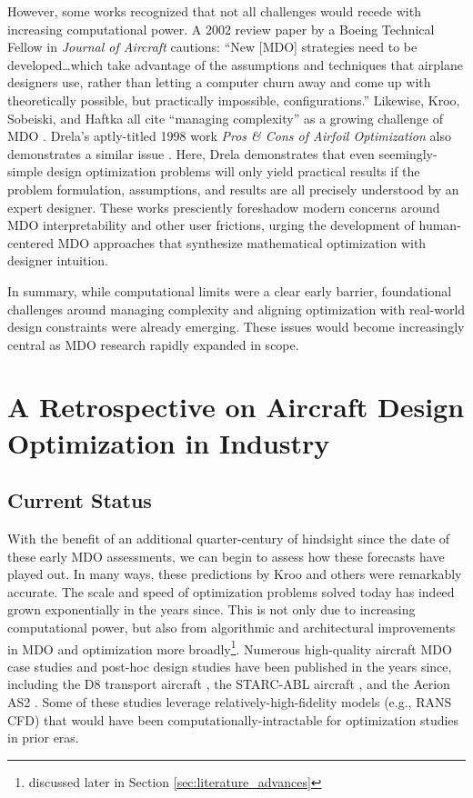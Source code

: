 \documentclass[12pt,vi,oneside]{report}
\begin{document}
    However, some works recognized that not all challenges would recede with increasing computational power. A 2002 review paper by a Boeing Technical Fellow in \textit{Journal of Aircraft} \cite{mcmasters_airplane_2002} cautions: ``New [MDO] strategies need to be developed\dots which take advantage of the assumptions and techniques that airplane designers use, rather than letting a computer churn away and come up with theoretically possible, but practically impossible, configurations.'' Likewise, Kroo, Sobeiski, and Haftka all cite ``managing complexity'' as a growing challenge of MDO \cite{kroo_multidisciplinary_1997, haftka_multidisciplinary_1997}. Drela's aptly-titled 1998 work \textit{Pros \& Cons of Airfoil Optimization} also demonstrates a similar issue \cite{drela_pros_1998}. Here, Drela demonstrates that even seemingly-simple design optimization problems will only yield practical results if the problem formulation, assumptions, and results are all precisely understood by an expert designer. These works presciently foreshadow modern concerns around MDO interpretability and other user frictions, urging the development of human-centered MDO approaches that synthesize mathematical optimization with designer intuition.

    In summary, while computational limits were a clear early barrier, foundational challenges around managing complexity and aligning optimization with real-world design constraints were already emerging. These issues would become increasingly central as MDO research rapidly expanded in scope.


    \section{A Retrospective on Aircraft Design Optimization in Industry}

    \subsection*{Current Status}

    With the benefit of an additional quarter-century of hindsight since the date of these early MDO assessments, we can begin to assess how these forecasts have played out. In many ways, these predictions by Kroo and others were remarkably accurate. The scale and speed of optimization problems solved today has indeed grown exponentially in the years since. This is not only due to increasing computational power, but also from algorithmic and architectural improvements in MDO and optimization more broadly\footnote{discussed later in Section \ref{sec:literature_advances}}. Numerous high-quality aircraft MDO case studies and post-hoc design studies have been published in the years since, including the D8 transport aircraft \cite{drela_development_2011, drela_tasopt_2010}, the STARC-ABL aircraft \cite{yildirim_performance_2021}, and the Aerion AS2 \cite{bons_highfidelity_2020}. Some of these studies leverage relatively-high-fidelity models (e.g., RANS CFD) that would have been computationally-intractable for optimization studies in prior eras.
\end{document}
